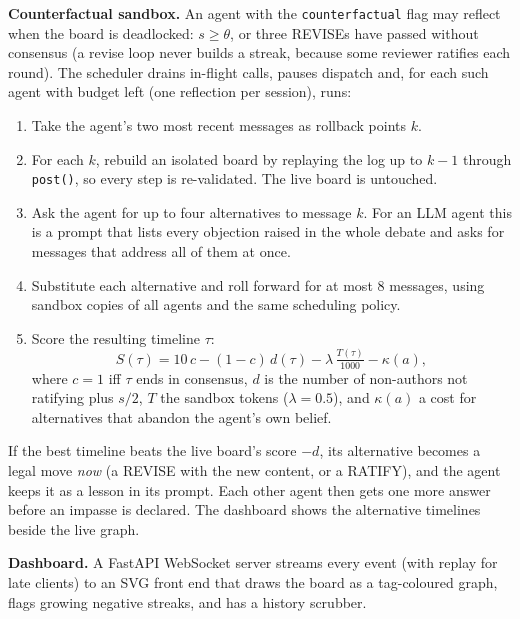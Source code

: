 \documentclass[11pt,a4paper,twocolumn]{article}
\begin{document}
\textbf{Counterfactual sandbox.} An agent with the \texttt{counterfactual} flag may
reflect when the board is deadlocked: $s \ge \theta$, or three REVISEs have passed
without consensus (a revise loop never builds a streak, because some reviewer ratifies
each round). The scheduler drains in-flight calls, pauses dispatch and, for each such
agent with budget left (one reflection per session), runs:
\begin{enumerate}
  \item Take the agent's two most recent messages as rollback points $k$.
  \item For each $k$, rebuild an isolated board by replaying the log up to $k-1$ through
        \texttt{post()}, so every step is re-validated. The live board is untouched.
  \item Ask the agent for up to four alternatives to message $k$. For an LLM agent this
        is a prompt that lists every objection raised in the whole debate and asks for
        messages that address all of them at once.
  \item Substitute each alternative and roll forward for at most 8 messages, using
        sandbox copies of all agents and the same scheduling policy.
  \item Score the resulting timeline $\tau$:
  \begin{equation*}
    S(\tau) = 10\,c - (1-c)\,d(\tau) - \lambda\,\tfrac{T(\tau)}{1000} - \kappa(a),
  \end{equation*}
  where $c=1$ iff $\tau$ ends in consensus, $d$ is the number of non-authors not ratifying plus $s/2$, $T$ the sandbox
  tokens ($\lambda=0.5$), and $\kappa(a)$ a cost for alternatives that abandon the
  agent's own belief.
\end{enumerate}
If the best timeline beats the live board's score $-d$, its alternative becomes a legal
move \emph{now} (a REVISE with the new content, or a RATIFY), and the agent keeps it as a
lesson in its prompt. Each other agent then gets one more answer before an impasse is
declared. The dashboard shows the alternative timelines beside the live graph.

\textbf{Dashboard.} A FastAPI WebSocket server streams every event (with replay for late
clients) to an SVG front end that draws the board as a tag-coloured graph, flags growing
negative streaks, and has a history scrubber.
\end{document}
